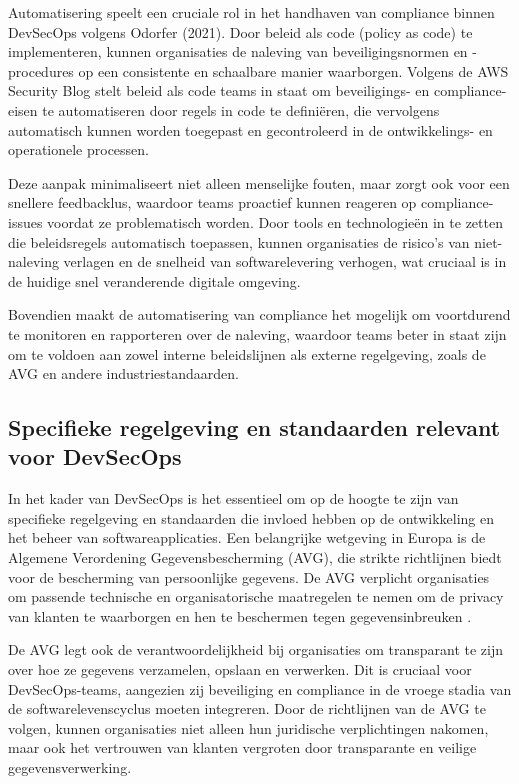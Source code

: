 \documentclass{hogent-article}
\begin{document}
   Automatisering speelt een cruciale rol in het handhaven van compliance binnen DevSecOps volgens Odorfer (2021). Door beleid als code (policy as code) te implementeren, kunnen organisaties de naleving van beveiligingsnormen en -procedures op een consistente en schaalbare manier waarborgen. Volgens de AWS Security Blog stelt beleid als code teams in staat om beveiligings- en compliance-eisen te automatiseren door regels in code te definiëren, die vervolgens automatisch kunnen worden toegepast en gecontroleerd in de ontwikkelings- en operationele processen.
   
   Deze aanpak minimaliseert niet alleen menselijke fouten, maar zorgt ook voor een snellere feedbacklus, waardoor teams proactief kunnen reageren op compliance-issues voordat ze problematisch worden. Door tools en technologieën in te zetten die beleidsregels automatisch toepassen, kunnen organisaties de risico's van niet-naleving verlagen en de snelheid van softwarelevering verhogen, wat cruciaal is in de huidige snel veranderende digitale omgeving.
   
   Bovendien maakt de automatisering van compliance het mogelijk om voortdurend te monitoren en rapporteren over de naleving, waardoor teams beter in staat zijn om te voldoen aan zowel interne beleidslijnen als externe regelgeving, zoals de AVG en andere industriestandaarden.\autocite{Odorfer2021}
   
   \subsection{Specifieke regelgeving en standaarden relevant voor DevSecOps}
   
  In het kader van DevSecOps is het essentieel om op de hoogte te zijn van specifieke regelgeving en standaarden die invloed hebben op de ontwikkeling en het beheer van softwareapplicaties. Een belangrijke wetgeving in Europa is de Algemene Verordening Gegevensbescherming (AVG), die strikte richtlijnen biedt voor de bescherming van persoonlijke gegevens. De AVG verplicht organisaties om passende technische en organisatorische maatregelen te nemen om de privacy van klanten te waarborgen en hen te beschermen tegen gegevensinbreuken .
  
  De AVG legt ook de verantwoordelijkheid bij organisaties om transparant te zijn over hoe ze gegevens verzamelen, opslaan en verwerken. Dit is cruciaal voor DevSecOps-teams, aangezien zij beveiliging en compliance in de vroege stadia van de softwarelevenscyclus moeten integreren. Door de richtlijnen van de AVG te volgen, kunnen organisaties niet alleen hun juridische verplichtingen nakomen, maar ook het vertrouwen van klanten vergroten door transparante en veilige gegevensverwerking.
  
\end{document}
